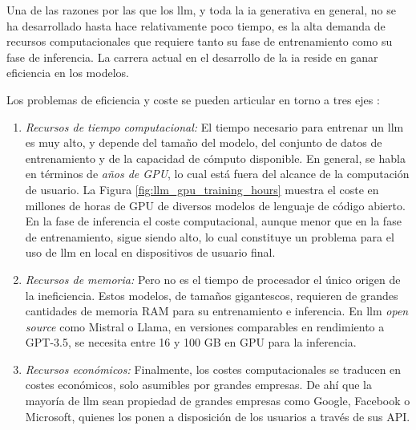 Una de las razones por las que los \gls{llm}, y toda la \gls{ia} generativa en general, no se ha desarrollado hasta hace relativamente poco tiempo, es la alta demanda de recursos computacionales que requiere tanto su fase de entrenamiento como su fase de inferencia. La carrera actual en el desarrollo de la \gls{ia} reside en ganar eficiencia en los modelos. 

Los problemas de eficiencia y coste se pueden articular en torno a tres ejes \citep{arunbijiRAGVsFinetuning}:

\begin{enumerate}[label=\alph*)]
    \item \textit{Recursos de tiempo computacional:} El tiempo necesario para entrenar un \gls{llm} es muy alto, y depende del tamaño del modelo, del conjunto de datos de entrenamiento y de la capacidad de cómputo disponible. En general, se habla en términos de \emph{años de GPU}, lo cual está fuera del alcance de la computación de usuario. La Figura \ref{fig:llm_gpu_training_hours} muestra el coste en millones de horas de GPU de diversos modelos de lenguaje de código abierto. En la fase de inferencia el coste computacional, aunque menor que en la fase de entrenamiento, sigue siendo alto, lo cual constituye un problema para el uso de \gls{llm} en local en dispositivos de usuario final.
    \item \textit{Recursos de memoria:} Pero no es el tiempo de procesador el único origen de la ineficiencia. Estos modelos, de tamaños gigantescos, requieren de grandes cantidades de memoria RAM para su entrenamiento e inferencia. En \gls{llm} \emph{open source} como Mistral o Llama, en versiones comparables en rendimiento a GPT-3.5, se necesita entre 16 y 100 GB en GPU para la inferencia. 
    \item \textit{Recursos económicos:} Finalmente, los costes computacionales se traducen en costes económicos, solo asumibles por grandes empresas. De ahí que la mayoría de \gls{llm} sean propiedad de grandes empresas como Google, Facebook o Microsoft, quienes los ponen a disposición de los usuarios a través de sus API.
\end{enumerate}

